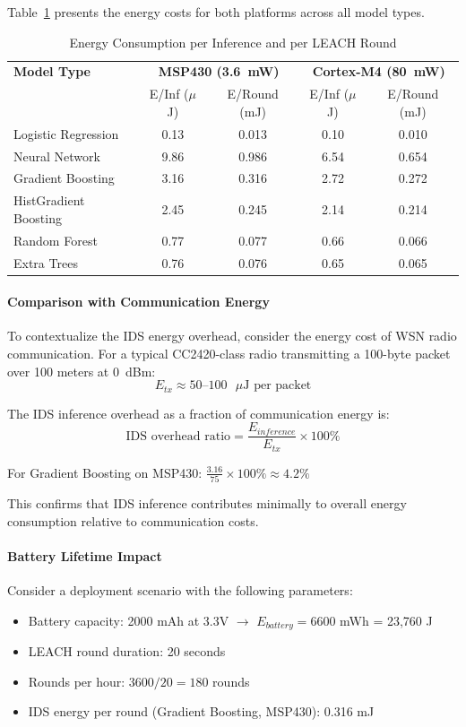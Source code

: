 Table~\ref{tab:energy} presents the energy costs for both platforms across all model types.

\begin{table}[htbp]
\centering
\caption{Energy Consumption per Inference and per LEACH Round}
\label{tab:energy}
\begin{tabular}{lcccc}
\hline
\textbf{Model Type} & \multicolumn{2}{c}{\textbf{MSP430 (3.6~mW)}} & \multicolumn{2}{c}{\textbf{Cortex-M4 (80~mW)}} \\
 & E/Inf ($\mu$J) & E/Round (mJ) & E/Inf ($\mu$J) & E/Round (mJ) \\
\hline
Logistic Regression & 0.13 & 0.013 & 0.10 & 0.010 \\
Neural Network & 9.86 & 0.986 & 6.54 & 0.654 \\
Gradient Boosting & 3.16 & 0.316 & 2.72 & 0.272 \\
HistGradient Boosting & 2.45 & 0.245 & 2.14 & 0.214 \\
Random Forest & 0.77 & 0.077 & 0.66 & 0.066 \\
Extra Trees & 0.76 & 0.076 & 0.65 & 0.065 \\
\hline
\end{tabular}
\end{table}

\paragraph{Comparison with Communication Energy}
To contextualize the IDS energy overhead, consider the energy cost of WSN radio communication. For a typical CC2420-class radio transmitting a 100-byte packet over 100 meters at 0~dBm:
\begin{equation}
    E_{tx} \approx 50\text{--}100 \text{ }\mu\text{J per packet}
\end{equation}

The IDS inference overhead as a fraction of communication energy is:
\begin{equation}
    \text{IDS overhead ratio} = \frac{E_{inference}}{E_{tx}} \times 100\%
\end{equation}

For Gradient Boosting on MSP430: $\frac{3.16}{75} \times 100\% \approx 4.2\%$

This confirms that IDS inference contributes minimally to overall energy consumption relative to communication costs.

\paragraph{Battery Lifetime Impact}
Consider a deployment scenario with the following parameters:
\begin{itemize}
    \item Battery capacity: 2000 mAh at 3.3V $\rightarrow$ $E_{battery} = 6600$ mWh = 23,760 J
    \item LEACH round duration: 20 seconds
    \item Rounds per hour: $3600/20 = 180$ rounds
    \item IDS energy per round (Gradient Boosting, MSP430): 0.316 mJ
\end{itemize}

